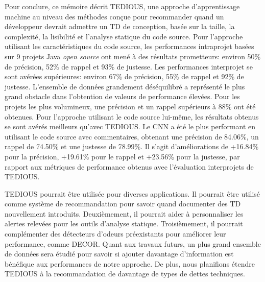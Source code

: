 Pour conclure, ce m\'{e}moire d\'{e}crit \ac{TEDIOUS}, une approche d'apprentissage machine au niveau des m\'{e}thodes con\c{c}ue pour recommander quand un d\'{e}veloppeur devrait admettre un \ac{TD} de conception, bas\'{e}e sur la taille, la complexit\'{e}, la lisibilit\'{e} et l'analyse statique du code source. Pour l'approche utilisant les caract\'{e}ristiques du code source, les performances intraprojet bas\'{e}es sur 9 projets Java \emph{open source} ont men\'{e} \`{a} des r\'{e}sultats prometteurs: environ 50\% de pr\'{e}cision, 52\% de rappel et 93\% de justesse. Les performances interprojet se sont av\'{e}r\'{e}es sup\'{e}rieures: environ 67\% de pr\'{e}cision, 55\% de rappel et 92\% de justesse. L'ensemble de donn\'{e}es grandement d\'{e}s\'{e}quilibr\'{e} a repr\'{e}sent\'{e} le plus grand obstacle dans l'obtention de valeurs de performance \'{e}lev\'{e}es. Pour les projets les plus volumineux, une pr\'{e}cision et un rappel sup\'{e}rieurs \`{a} 88\% ont \'{e}t\'{e} obtenues. Pour l'approche utilisant le code source lui-m\^{e}me, les r\'{e}sultats obtenus se sont av\'{e}r\'{e}s meilleurs qu'avec TEDIOUS. Le CNN a \'{e}t\'{e} le plus performant en utilisant le code source avec commentaires, obtenant une pr\'{e}cision de 84.06\%, un rappel de 74.50\% et une justesse de 78.99\%. Il s'agit d'am\'{e}liorations de +16.84\% pour la pr\'{e}cision, +19.61\% pour le rappel et +23.56\% pour la justesse, par rapport aux m\'{e}triques de performance obtenus avec l'\'{e}valuation interprojets de TEDIOUS.

\ac{TEDIOUS} pourrait \^{e}tre utilis\'{e}e pour diverses applications. Il pourrait \^{e}tre utilis\'{e} comme syst\`{e}me de recommandation pour savoir quand documenter des \ac{TD} nouvellement introduits. Deuxi\`{e}mement, il pourrait aider \`{a} personnaliser les alertes relev\'{e}es pour les outils d'analyse statique. Troisi\`{e}mement, il pourrait compl\'{e}menter des d\'{e}tecteurs d'odeurs pr\'{e}existants pour am\'{e}liorer leur performance, comme \ac{DECOR}. Quant aux travaux futurs, un plus grand ensemble de donn\'{e}es sera \'{e}tudi\'{e} pour savoir si ajouter davantage d'information est b\'{e}n\'{e}fique aux performances de notre approche. De plus, nous planifions \'{e}tendre \ac{TEDIOUS} \`{a} la recommandation de davantage de types de dettes techniques.























